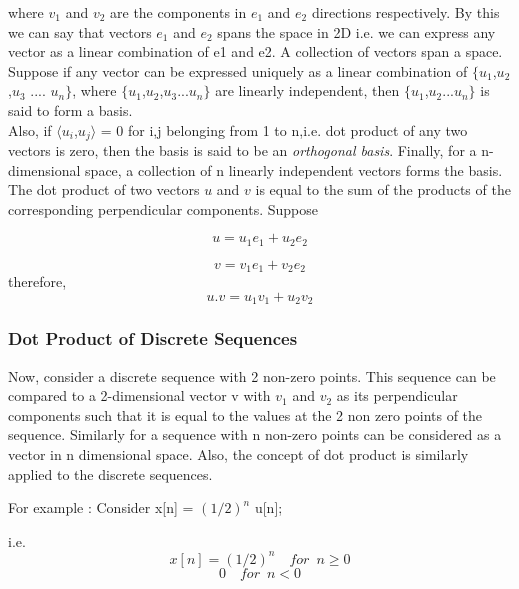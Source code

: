     where $v_1$ and $v_2$ are the components in $e_1$ and $e_2$ directions respectively.
By this we can say that vectors $e_1$ and $e_2$ spans the space in 2D i.e. we can express any vector as a linear combination of e1 and e2. A collection of vectors span a space. Suppose if any vector can be expressed uniquely as a linear combination of $\{ u_1$,$u_2$,$u_3$ .... $u_n \}$, where $\{ u_1$,$u_2$,$u_3$...$u_n \}$ are linearly independent, then $\{ u_1$,$u_2$...$u_n \}$ is said to form a basis.\\
\noindent
Also, if $\langle u_i$,$u_j \rangle$ = 0 for i,j belonging from 1 to n,i.e. dot product of any two vectors is zero,  then the basis is said to be an \textit{orthogonal basis}. Finally, for a n-dimensional space, a collection of n linearly independent vectors forms the basis.\\
\noindent
The dot product of two vectors $u$ and $v$ is equal to the sum of the products of the corresponding perpendicular components. Suppose

				\begin{equation*}u = u_1e_1 + u_2e_2\end{equation*}
                        
                        \begin{equation*}v = v_1e_1 + v_2e_2\end{equation*} 
\noindent                        
                        therefore,\begin{equation*} u.v = u_1v_1 + u_2v_2\end{equation*}
           
\subsubsection{Dot Product of Discrete Sequences}           
Now, consider a discrete sequence with 2 non-zero points. This sequence can be compared to a 2-dimensional vector v with $v_1$ and $v_2$ as its perpendicular components such that it is equal to the values at the 2 non zero points of the sequence. Similarly for a sequence with n non-zero points can be considered as a vector in n dimensional space. Also, the concept of dot product is similarly applied to the discrete sequences.

For example : Consider
	x[n] = $(1/2)^n$ u[n];
    
    i.e.
     \begin{equation*}
    x[n] = (1/2)^n	\enspace	\enspace for\enspace	 n\geq0\end{equation*}
    \begin{equation*}	 0	\enspace  \enspace	 for\enspace	 n<0\end{equation*}
               
